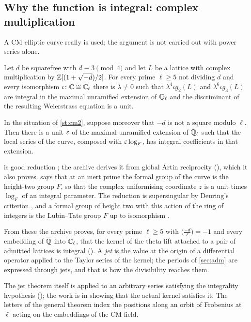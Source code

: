 \subsection{Why the function is integral: complex multiplication}
A CM elliptic curve really is used; the argument is not carried out with power series alone.
\begin{statement}[\lean{CM2}]\label{st:cm2}
Let $d$ be squarefree with $d\equiv3\pmod4$ and let $L$ be a lattice with complex
multiplication by $\mathbb{Z}[(1+\sqrt{-d})/2]$. For every prime $\ell\ge5$ not dividing $d$ and every
isomorphism $\iota\colon\mathbb{C}\cong\mathbb{C}_\ell$ there is $\lambda\ne0$ such that
$\lambda^4\iota g_2(L)$ and $\lambda^6\iota g_3(L)$ are integral in the maximal unramified
extension of $\mathbb{Q}_\ell$ and the discriminant of the resulting Weierstrass equation is a unit.
\end{statement}
\begin{statement}[\lean{CM3}]\label{st:cm3}
In the situation of \cref{st:cm2}, suppose moreover that $-d$ is not a square modulo $\ell$.
Then there is a unit $\varepsilon$ of the maximal unramified extension of $\mathbb{Q}_\ell$ such that the
local series of the curve, composed with $\varepsilon\log_F$, has integral coefficients in that
extension.
\end{statement}
 is good reduction \cite{serretate1968}; the archive derives it from global Artin
reciprocity \lvS{} (), which it also proves.
 says that at an inert prime the formal group of the curve is the height-two group
$F$, so that the complex uniformising coordinate $z$ is a unit times $\log_F$ of an integral
parameter. The reduction is supersingular by Deuring's criterion \cite{deuring1941}, and a
formal group of height two with this action of the ring of integers is the Lubin--Tate group
$F$ up to isomorphism \cite{lubintate1965,honda1970}.

From these the archive proves, for every prime $\ell\ge5$ with $\bigl(\tfrac{-d}{\ell}\bigr)=-1$ and
every embedding of $\overline{\mathbb{Q}}$ into $\mathbb{C}_\ell$, that the kernel of the theta lift attached to a
pair of admitted lattices is integral \lvS{} (). A \emph{jet} is the value at
the origin of a differential operator applied to the Taylor series of the kernel; the periods
of \cref{sec:adm} are expressed through jets, and that is how the divisibility reaches them.

The jet theorem itself is applied to an arbitrary series satisfying the integrality hypothesis
\lvP{} (); the work is in showing that the actual kernel
satisfies it. The letters of the general theorem index the positions along an orbit of
Frobenius at $\ell$ acting on the embeddings of the CM field.

